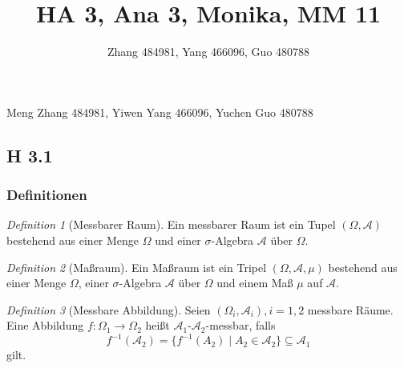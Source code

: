 \documentclass[fleqn,draft,a5paper]{article}
\title{HA 3, Ana 3, Monika, MM 11}
\author{Zhang 484981, Yang 466096, Guo 480788}
\theoremstyle{remark}
\newtheorem*{Definition}{Definition}
\begin{document}
\maketitle
\begin{center}
  Meng Zhang 484981, Yiwen Yang 466096, Yuchen Guo 480788
\end{center}
\subsection{H 3.1}
\subsubsection{Definitionen}
\begin{Definition}[Messbarer Raum]
  Ein messbarer Raum ist ein Tupel \((\Omega, \mathcal{A})\) bestehend aus einer
  Menge \(\Omega\) und einer \(\sigma\)-Algebra \(\mathcal{A}\) über \(\Omega\).
\end{Definition}
\begin{Definition}[Maßraum]
  Ein Maßraum ist ein Tripel \((\Omega, \mathcal{A}, \mu)\) bestehend aus einer
  Menge \(\Omega\), einer \(\sigma\)-Algebra \(\mathcal{A}\) über \(\Omega\) und einem Maß \(\mu\) auf \(\mathcal{A}\).
\end{Definition}
\begin{Definition}[Messbare Abbildung]
  Seien \((\Omega_{i}, \mathcal{A}_{i}), i = 1, 2\) messbare Räume.  Eine Abbildung
  \(f\colon \Omega_{1} \to \Omega_{2}\) heißt \(\mathcal{A}_{1}\)-\(\mathcal{A}_{2}\)-messbar, falls
  \[
    f^{-1}(\mathcal{A}_{2}) = \{f^{-1}(A_{2}) \mid A_{2} \in \mathcal{A}_{2}\} \subseteq \mathcal{A}_{1}
  \]
  gilt.
\end{Definition}
\end{document}
